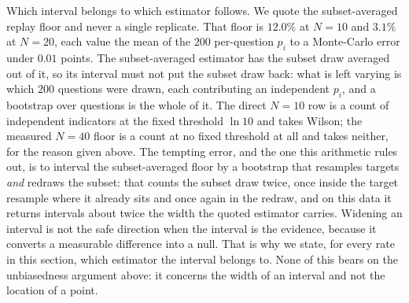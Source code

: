 Which interval belongs to which estimator follows. We quote the subset-averaged replay
floor and never a single replicate. That floor is $12.0\%$ at $N{=}10$ and $3.1\%$ at
$N{=}20$, each value the mean of the $200$ per-question
$p_i$ to a Monte-Carlo error under $0.01$ points. The subset-averaged
estimator has the subset draw averaged out of it, so its interval must not put the subset
draw back: what is left varying is which $200$ questions were drawn, each contributing an
independent $p_i$, and a bootstrap over questions is the whole of it. The direct $N{=}10$
row is a count of independent indicators at the fixed threshold $\ln 10$ and takes Wilson;
the measured $N{=}40$ floor is a count at no fixed threshold at all and takes neither, for the
reason given above. The tempting error, and the one this arithmetic rules out,
is to interval the subset-averaged floor by a bootstrap that resamples targets \emph{and}
redraws the subset: that counts the subset draw twice, once inside the target resample where
it already sits and once again in the redraw, and on this data it returns intervals about
twice the width the quoted estimator carries. Widening an interval is not the safe direction
when the interval is the evidence, because it converts a measurable difference into a null.
That is why we state, for every rate in this section, which estimator the interval belongs to.
None of this bears on the unbiasedness argument above: it concerns the width of an interval
and not the location of a point.

